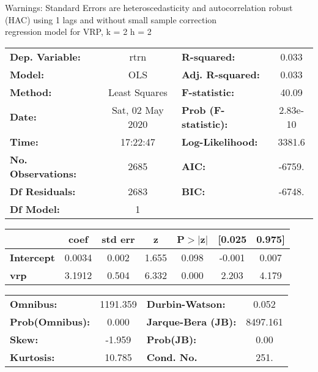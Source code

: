 Warnings: \newline
 [1] Standard Errors are heteroscedasticity and autocorrelation robust (HAC) using 1 lags and without small sample correction\\ 

regression model for VRP, k = 2 h = 2\begin{center}
\begin{tabular}{lclc}
\toprule
\textbf{Dep. Variable:}    &       rtrn       & \textbf{  R-squared:         } &     0.033   \\
\textbf{Model:}            &       OLS        & \textbf{  Adj. R-squared:    } &     0.033   \\
\textbf{Method:}           &  Least Squares   & \textbf{  F-statistic:       } &     40.09   \\
\textbf{Date:}             & Sat, 02 May 2020 & \textbf{  Prob (F-statistic):} &  2.83e-10   \\
\textbf{Time:}             &     17:22:47     & \textbf{  Log-Likelihood:    } &    3381.6   \\
\textbf{No. Observations:} &        2685      & \textbf{  AIC:               } &    -6759.   \\
\textbf{Df Residuals:}     &        2683      & \textbf{  BIC:               } &    -6748.   \\
\textbf{Df Model:}         &           1      & \textbf{                     } &             \\
\bottomrule
\end{tabular}
\begin{tabular}{lcccccc}
                   & \textbf{coef} & \textbf{std err} & \textbf{z} & \textbf{P$> |$z$|$} & \textbf{[0.025} & \textbf{0.975]}  \\
\midrule
\textbf{Intercept} &       0.0034  &        0.002     &     1.655  &         0.098        &       -0.001    &        0.007     \\
\textbf{vrp}       &       3.1912  &        0.504     &     6.332  &         0.000        &        2.203    &        4.179     \\
\bottomrule
\end{tabular}
\begin{tabular}{lclc}
\textbf{Omnibus:}       & 1191.359 & \textbf{  Durbin-Watson:     } &    0.052  \\
\textbf{Prob(Omnibus):} &   0.000  & \textbf{  Jarque-Bera (JB):  } & 8497.161  \\
\textbf{Skew:}          &  -1.959  & \textbf{  Prob(JB):          } &     0.00  \\
\textbf{Kurtosis:}      &  10.785  & \textbf{  Cond. No.          } &     251.  \\
\bottomrule
\end{tabular}
\end{center}

